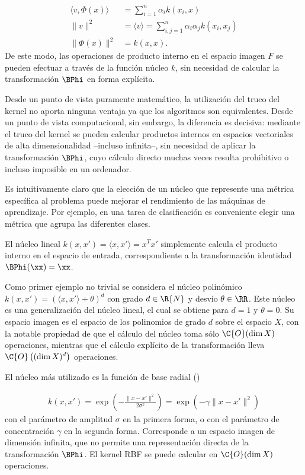 \begin{align}
  \langle{}v,\Phi(x)\rangle &= \sum_{i=1}^{n}\alpha_ik(x_i,x) \\
  \|v\|^2 &= \langle{}v\rangle=\sum_{i,j=1}^n\alpha_i\alpha_jk(x_i,x_j)\\
  \|\Phi(x)\|^2 &=k(x,x).
\end{align}
De este modo, las operaciones de producto interno en el espacio imagen
$F$ se pueden efectuar a través de la función núcleo $k$, sin necesidad
de calcular la transformación $\BPhi$ en forma explícita.

Desde un punto de vista puramente matemático, la utilización del truco
del kernel no aporta ninguna ventaja ya que los algoritmos son
equivalentes. Desde un punto de vista computacional, sin embargo, la
diferencia es decisiva: mediante el truco del kernel se pueden
calcular productos internos en espacios vectoriales de alta
dimensionalidad --incluso infinita--, sin necesidad de aplicar la
transformación $\BPhi$, cuyo cálculo directo muchas veces resulta
prohibitivo o incluso imposible en un ordenador.

Es intuitivamente claro que la elección de un núcleo que represente
una métrica específica al problema puede mejorar el rendimiento de las
máquinas de aprendizaje. Por ejemplo, en una tarea de clasificación es
conveniente elegir una métrica que agrupa las diferentes clases.

El núcleo lineal $k(x,x')=\langle{}x,x'\rangle=x^Tx'$ simplemente
calcula el producto interno en el espacio de entrada, correspondiente
a la transformación identidad $\BPhi(\xx)=\xx$.

Como primer ejemplo no trivial se considera el núcleo polinómico
$k(x,x')=\left(\langle{}x,x'\rangle+\theta\right)^d$ con grado
$d\in\R{N}$ y desvío $\theta\in\RR$. Este núcleo es una generalización
del núcleo lineal, el cual se obtiene para $d=1$ y $\theta=0$. Su
espacio imagen es el espacio de los polinomios de grado
$d$ sobre el espacio $X$, con la notable propiedad de que
el cálculo del núcleo toma sólo $\C{O}(\dim{}X)$ operaciones,
mientras que el cálculo explícito de la transformación
lleva 
$\C{O}\left((\dim{}X)^d\right)$ operaciones.

El núcleo más utilizado es la función de base radial
()

\begin{align}
  k(x,x')=\exp\left(-\frac{\|x-x'\|^2}{2\sigma^2}\right)
  =\exp\left(-\gamma\|x-x'\|^2\right)
\end{align}
con el parámetro de amplitud $\sigma$ en la primera forma, o con el
parámetro de concentración $\gamma$ en la segunda forma. Corresponde
a un espacio imagen de dimensión infinita, que no permite
una representación directa de la transformación $\BPhi$.
El kernel RBF se puede calcular
en $\C{O}(\dim{}X)$ operaciones.

